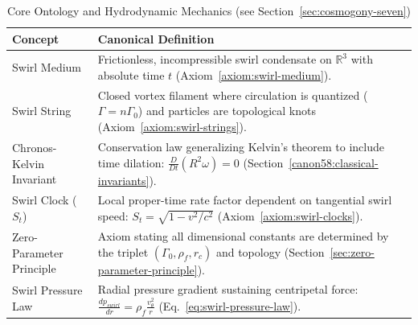 \documentclass[10pt,reprint,aps,onecolumn,nofootinbib]{revtex4-2}
\begin{document}
                \begin{table}[h!]
                    \centering
                    \scriptsize
                    \caption{Core Ontology and Hydrodynamic Mechanics (see Section~\ref{sec:cosmogony-seven})}
                    \label{tab:glossary-ontology}
                    \renewcommand{\arraystretch}{1.5}
                    \begin{tabular}{|l|p{9cm}|}
                        \hline
                        \textbf{Concept} & \textbf{Canonical Definition} \\
                        \hline
                        Swirl Medium & Frictionless, incompressible swirl condensate on $\mathbb{R}^{3}$ with absolute time $t$ (Axiom~\ref{axiom:swirl-medium}). \\
                        \hline
                        Swirl String & Closed vortex filament where circulation is quantized ($\Gamma=n\Gamma_0$) and particles are topological knots (Axiom~\ref{axiom:swirl-strings}). \\
                        \hline
                        Chronos-Kelvin Invariant & Conservation law generalizing Kelvin's theorem to include time dilation: $\frac{D}{Dt}(R^{2}\omega) = 0$ (Section~\ref{canon58:classical-invariants}). \\
                        \hline
                        Swirl Clock ($S_{t}$) & Local proper-time rate factor dependent on tangential swirl speed: $S_{t} = \sqrt{1 - v^{2}/c^{2}}$ (Axiom~\ref{axiom:swirl-clocks}). \\
                        \hline
                        Zero-Parameter Principle & Axiom stating all dimensional constants are determined by the triplet $(\Gamma_{0}, \rho_{\!f}, r_{c})$ and topology (Section~\ref{sec:zero-parameter-principle}). \\
                        \hline
                        Swirl Pressure Law & Radial pressure gradient sustaining centripetal force: $\frac{dp_{swirl}}{dr} = \rho_{\!f}\frac{v_{\theta}^{2}}{r}$ (Eq.~\ref{eq:swirl-pressure-law}). \\
                        \hline
                    \end{tabular}
                \end{table}
\end{document}

